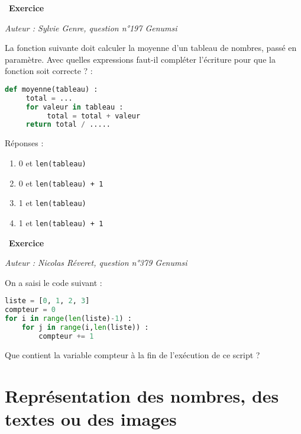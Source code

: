 \documentclass[
  11pt,
]{article}
\newcommand{\passthrough}[1]{#1}
\providecommand{\tightlist}{%
  \setlength{\itemsep}{0pt}\setlength{\parskip}{0pt}}
\newcounter{exo}
\newenvironment{exercice}[1]
{\par \medskip   \addtocounter{exo}{1} \noindent  
\begin{bclogo}[arrondi =0.1,   noborder = true, logo=\bccrayon, marge=4]{~\textbf{Exercice} \textbf{\theexo} {\itshape #1} }  \par}
{
\end{bclogo}
 \par \bigskip }
\newcounter{def}
\begin{document}
\begin{exercice}{}

\emph{Auteur : Sylvie Genre, question n°197 Genumsi}

La fonction suivante doit calculer la moyenne d'un tableau de nombres,
passé en paramètre. Avec quelles expressions faut-il compléter
l'écriture pour que la fonction soit correcte ? :

\begin{lstlisting}[language=Python]
def moyenne(tableau) :
     total = ...
     for valeur in tableau :
          total = total + valeur
     return total / .....
\end{lstlisting}

Réponses :

\begin{enumerate}
\def\labelenumi{\arabic{enumi}.}
\tightlist
\item
  0 et \passthrough{\lstinline!len(tableau)!}
\item
  0 et \passthrough{\lstinline!len(tableau) + 1!}
\item
  1 et \passthrough{\lstinline!len(tableau)!}
\item
  1 et \passthrough{\lstinline!len(tableau) + 1!}
\end{enumerate}

\end{exercice}

\begin{exercice}{}

\emph{Auteur : Nicolas Réveret, question n°379 Genumsi}

On a saisi le code suivant :

\begin{lstlisting}[language=Python]
liste = [0, 1, 2, 3]
compteur = 0
for i in range(len(liste)-1) :
    for j in range(i,len(liste)) :
        compteur += 1
\end{lstlisting}

Que contient la variable compteur à la fin de l'exécution de ce script ?

\end{exercice}

\hypertarget{repruxe9sentation-des-nombres-des-textes-ou-des-images}{%
\section{Représentation des nombres, des textes ou des
images}\label{repruxe9sentation-des-nombres-des-textes-ou-des-images}}
\end{document}

